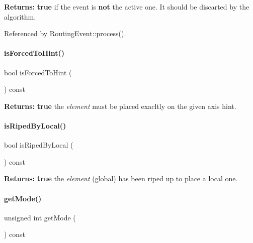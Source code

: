 {\bfseries Returns\+:} {\bfseries true} if the event is {\bfseries not} the active one. It should be discarted by the algorithm. 

Referenced by Routing\+Event\+::process().

\mbox{\label{classKite_1_1RoutingEvent_a6e38564fbae008179d865f844acba59a}} 
\paragraph{\texorpdfstring{is\+Forced\+To\+Hint()}{isForcedToHint()}}
{\footnotesize\ttfamily bool is\+Forced\+To\+Hint (\begin{DoxyParamCaption}{ }\end{DoxyParamCaption}) const\hspace{0.3cm}{\ttfamily [inline]}}

{\bfseries Returns\+:} {\bfseries true} the {\itshape element} must be placed exacltly on the given axis hint. \mbox{\label{classKite_1_1RoutingEvent_ac460ce43ff71dcdf11091403c4ba9060}} 
\paragraph{\texorpdfstring{is\+Riped\+By\+Local()}{isRipedByLocal()}}
{\footnotesize\ttfamily bool is\+Riped\+By\+Local (\begin{DoxyParamCaption}{ }\end{DoxyParamCaption}) const\hspace{0.3cm}{\ttfamily [inline]}}

{\bfseries Returns\+:} {\bfseries true} the {\itshape element} (global) has been riped up to place a local one. \mbox{\label{classKite_1_1RoutingEvent_a150a8fe8d214e9de76153c1d20676a98}} 
\paragraph{\texorpdfstring{get\+Mode()}{getMode()}}
{\footnotesize\ttfamily unsigned int get\+Mode (\begin{DoxyParamCaption}{ }\end{DoxyParamCaption}) const\hspace{0.3cm}{\ttfamily [inline]}}

